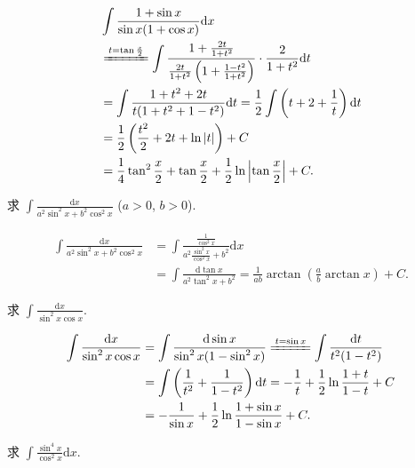 \begin{solution}
\begin{align*}
&\int\frac{1+\sin x}{\sin x(1+\cos x)}\mathrm{d}x\\
&\xlongequal{t=\tan\frac{x}{2}}\int\frac{1+\frac{2t}{1+t^{2}}}{\frac{2t}{1+t^{2}}\left(1+\frac{1-t^{2}}{1+t^{2}}\right)}\cdot\frac{2}{1+t^{2}}\mathrm{d}t\\
&=\int\frac{1+t^{2}+2t}{t(1+t^{2}+1-t^{2})}\mathrm{d}t=\frac{1}{2}\int\left(t+2+\frac{1}{t}\right)\mathrm{d}t\\
&=\frac{1}{2}\left(\frac{t^{2}}{2}+2t+\ln|t|\right)+C\\
&=\frac{1}{4}\tan^{2}\frac{x}{2}+\tan\frac{x}{2}+\frac{1}{2}\ln\left|\tan\frac{x}{2}\right|+C.
\end{align*}
\end{solution}

\begin{example}\label{ex:5.3.9}
求 $\int\frac{\mathrm{d}x}{a^{2}\sin^{2}x+b^{2}\cos^{2}x}$ ($a>0$, $b>0$).
\end{example}

\begin{solution}
\begin{align*}
\int\frac{\mathrm{d}x}{a^{2}\sin^{2}x+b^{2}\cos^{2}x}
&=\int\frac{\frac{1}{\cos^{2}x}}{a^{2}\frac{\sin^{2}x}{\cos^{2}x}+b^{2}}\mathrm{d}x\\
&=\int\frac{\mathrm{d}\tan x}{a^{2}\tan^{2}x+b^{2}}
=\frac{1}{ab}\arctan\left(\frac{a}{b}\arctan x\right)+C.
\end{align*}
\end{solution}

\begin{example}\label{ex:5.3.10}
求 $\int\frac{\mathrm{d}x}{\sin^{2}x\cos x}$.
\end{example}

\begin{solution}
\begin{align*}
\int\frac{\mathrm{d}x}{\sin^{2}x\cos x}&=\int\frac{\mathrm{d}\sin x}{\sin^{2}x(1-\sin^{2}x)}
\xlongequal{t=\sin x}\int\frac{\mathrm{d}t}{t^{2}(1-t^{2})}\\
&=\int\left(\frac{1}{t^{2}}+\frac{1}{1-t^{2}}\right)\mathrm{d}t=-\frac{1}{t}+\frac{1}{2}\ln\frac{1+t}{1-t}+C\\
&=-\frac{1}{\sin x}+\frac{1}{2}\ln\frac{1+\sin x}{1-\sin x}+C.
\end{align*}
\end{solution}

\begin{example}\label{ex:5.3.11}
求 $\int\frac{\sin^{4}x}{\cos^{2}x}\mathrm{d}x$.
\end{example}

